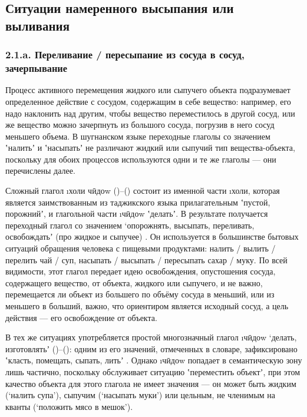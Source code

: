 \subsection{Ситуации намеренного высыпания или выливания} \label{pour-21}

\subsubsection{2.1.a. Переливание / пересыпание из сосуда в сосуд, зачерпывание} \label{pour-21a}

Процесс активного перемещения жидкого или сыпучего объекта подразумевает определенное действие с сосудом, содержащим в себе вещество: например, его надо наклонить над другим, чтобы вещество переместилось в другой сосуд, или же вещество можно зачерпнуть из большого сосуда, погрузив в него сосуд меньшего объема. В шугнанском языке переходные глаголы со значением ʽналитьʼ и ʽнасыпатьʼ не различают жидкий или сыпучий тип вещества-объекта, поскольку для обоих процессов используются одни и те же глаголы — они перечислены далее.

Сложный глагол \i{холи чӣдоw} ()–() состоит из именной части \i{холи}, которая является  заимствованным из таджикского языка прилагательным ʽпустой, порожнийʼ, и глагольной части \i{чӣдоw} ʽделатьʼ. В результате получается переходный глагол со значением ‘опорожнять, высыпать, переливать, освобождатьʼ (про жидкое и сыпучее) \parencite[218–219]{karamshoev1999}. Он используется в большинстве бытовых ситуаций обращения человека с пищевыми продуктами: налить / вылить / перелить чай / суп, насыпать / высыпать / пересыпать сахар / муку. По всей видимости, этот глагол передает идею освобождения, опустошения сосуда, содержащего вещество, от объекта, жидкого или сыпучего, и не важно, перемещается ли объект из большего по объёму сосуда в меньший, или из меньшего в больший, важно, что ориентиром является исходный сосуд, а цель действия — его освобождение от объекта.

\pagebreak[4]

В тех же ситуациях употребляется простой многозначный глагол \i{чӣдоw} ‘делать, изготовлятьʼ ()–(): одним из его значений, отмеченных в словаре, зафиксировано ʽкласть, помещать, сыпать, литьʼ \parencite[123–124]{karamshoev1991}. Однако \i{чӣдоw} попадает в семантическую зону  лишь частично, поскольку обслуживает ситуацию ʽпереместить объектʼ, при этом качество объекта для этого глагола не имеет значения — он может быть жидким (‘налить супа’), сыпучим (‘насыпать муки’) или цельным, не членимым на кванты (‘положить мясо в мешок’).

